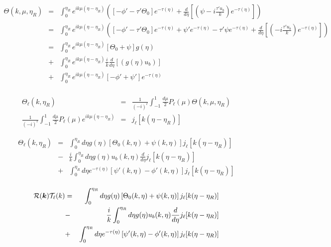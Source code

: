\documentclass[a4paper, 11pt]{article}
\def\ba{\begin{eqnarray}}
\def\ea{\end{eqnarray}}
\begin{document}
\ba
  \Theta(k, \mu, \eta_{R})  &=&  \int_{0}^{\eta_{R}} e^{ik \mu (\eta - \eta_{R}) } \left( \left[- \phi'  - \tau' \Theta_{0} \right] e^{- \tau(\eta)}  + \frac{d}{d\eta} \left[\left( \psi  -i  \frac{\tau' u_{b}}{k}\right)  e^{- \tau(\eta)} \right] \right) \nonumber \\
  &=&  \int_{0}^{\eta_{R}} e^{ik \mu (\eta - \eta_{R}) } \left( \left[- \phi'  - \tau' \Theta_{0} \right] e^{- \tau(\eta)}  + \psi' e^{- \tau(\eta)}  - \tau' \psi e^{- \tau(\eta)} +  \frac{d}{d\eta} \left[\left(  -i  \frac{\tau' u_{b}}{k}\right)  e^{- \tau(\eta)} \right] \right)  \nonumber \\
   &=& \int_{0}^{\eta_{R}} e^{ik \mu (\eta - \eta_{R}) }  \left[ \Theta_{0} + \psi \right] g(\eta) \\
   &+& \int_{0}^{\eta_{R}} e^{ik \mu (\eta - \eta_{R}) } \frac{i}{k} \frac{d}{d\eta} \left[\left(  g(\eta) u_{b}\right)  \right]  \\
   &+&  \int_{0}^{\eta_{R}} e^{ik \mu (\eta - \eta_{R}) }  \left[- \phi'  +\psi' \right]  e^{- \tau(\eta)} \\
         \ea

\ba
  \Theta_{\ell}(k, \eta_{R})&=& \frac{1}{(-i)^{\ell}} \int_{-1}^{1}  \frac{d\mu}{2} P_{\ell}(\mu)  \Theta(k, \mu, \eta_{R}) \\
  \frac{1}{(-i)^{\ell}} \int_{-1}^{1}  \frac{d\mu}{2} P_{\ell}(\mu)  e^{ik \mu (\eta - \eta_{R}) } &=& j_{\ell}[k(\eta-\eta_{R})]
\ea

\ba
  \Theta_{\ell}(k, \eta_{R})   &=& \int_{0}^{\eta_{R}} d\eta g(\eta) \left[ \Theta_{0}(k,\eta) + \psi(k,\eta) \right]  j_{\ell}[k(\eta-\eta_{R})] \\
   &- & \frac{i}{k} \int_{0}^{\eta_{R}} d\eta    g(\eta) u_{b} (k,\eta)    \frac{d}{d\eta}  j_{\ell}[k(\eta-\eta_{R})]   \\
   &+&  \int_{0}^{\eta_{R}} d\eta e^{- \tau(\eta)} \left[\psi'(k,\eta) - \phi'(k,\eta)   \right]  j_{\ell}[k(\eta-\eta_{R})]  \\
         \ea


\ba
{\cal R}(\bm k) {\cal T}_{\ell}(k)&=& \int_{0}^{\eta_{R}} d\eta g(\eta) \left[ \Theta_{0}(k,\eta) + \psi(k,\eta) \right]  j_{\ell}[k(\eta-\eta_{R})] \\
   &- & \frac{i}{k} \int_{0}^{\eta_{R}} d\eta    g(\eta) u_{b} (k,\eta)    \frac{d}{d\eta}  j_{\ell}[k(\eta-\eta_{R})]   \\
   &+&  \int_{0}^{\eta_{R}} d\eta e^{- \tau(\eta)} \left[\psi'(k,\eta) - \phi'(k,\eta)   \right]  j_{\ell}[k(\eta-\eta_{R})]  \\
         \ea
         
\end{document}
